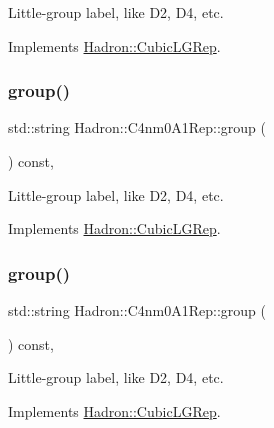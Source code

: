 Little-\/group label, like D2, D4, etc. 

Implements \mbox{\hyperlink{structHadron_1_1CubicLGRep_a9bdb14b519a611d21379ed96a3a9eb41}{Hadron\+::\+Cubic\+L\+G\+Rep}}.

\mbox{\label{structHadron_1_1C4nm0A1Rep_a8a1fbd6d906d95cd3fa74bac06176aaa}} 
\subsubsection{\texorpdfstring{group()}{group()}\hspace{0.1cm}{\footnotesize\ttfamily [3/5]}}
{\footnotesize\ttfamily std\+::string Hadron\+::\+C4nm0\+A1\+Rep\+::group (\begin{DoxyParamCaption}{ }\end{DoxyParamCaption}) const\hspace{0.3cm}{\ttfamily [inline]}, {\ttfamily [virtual]}}

Little-\/group label, like D2, D4, etc. 

Implements \mbox{\hyperlink{structHadron_1_1CubicLGRep_a9bdb14b519a611d21379ed96a3a9eb41}{Hadron\+::\+Cubic\+L\+G\+Rep}}.

\mbox{\label{structHadron_1_1C4nm0A1Rep_a8a1fbd6d906d95cd3fa74bac06176aaa}} 
\subsubsection{\texorpdfstring{group()}{group()}\hspace{0.1cm}{\footnotesize\ttfamily [4/5]}}
{\footnotesize\ttfamily std\+::string Hadron\+::\+C4nm0\+A1\+Rep\+::group (\begin{DoxyParamCaption}{ }\end{DoxyParamCaption}) const\hspace{0.3cm}{\ttfamily [inline]}, {\ttfamily [virtual]}}

Little-\/group label, like D2, D4, etc. 

Implements \mbox{\hyperlink{structHadron_1_1CubicLGRep_a9bdb14b519a611d21379ed96a3a9eb41}{Hadron\+::\+Cubic\+L\+G\+Rep}}.

\mbox{\label{structHadron_1_1C4nm0A1Rep_a8a1fbd6d906d95cd3fa74bac06176aaa}} 
